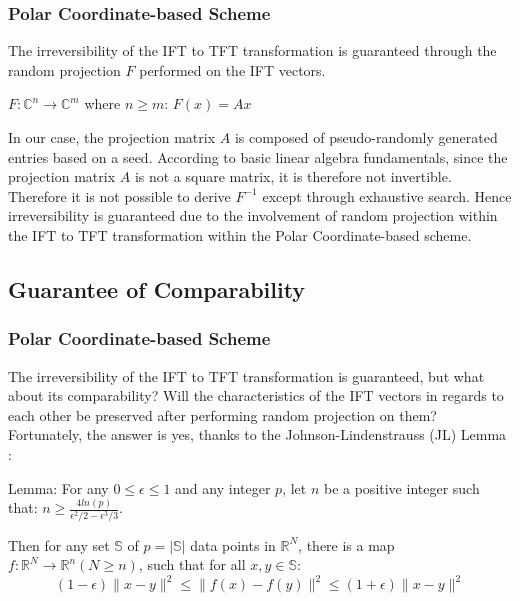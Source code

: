 \documentclass[fyp]{socreport}
\newcommand\norm[1]{\lVert#1\rVert}
\begin{document}
\subsubsection{Polar Coordinate-based Scheme}
The irreversibility of the IFT to TFT transformation is guaranteed through the random projection $F$ performed on the IFT vectors. 

\begin{center}
	$F: \mathbb{C}^{n} \to \mathbb{C}^m$ where $n \ge m$: $F(x) = Ax$
\end{center}

In our case, the projection matrix $A$ is composed of pseudo-randomly generated entries based on a seed. According to basic linear algebra fundamentals, since the projection matrix $A$ is not a square matrix, it is therefore not invertible. Therefore it is not possible to derive $F^{-1}$ except through exhaustive search. Hence irreversibility is guaranteed due to the involvement of random projection within the IFT to TFT transformation within the Polar Coordinate-based scheme.

\subsection{Guarantee of Comparability}
\subsubsection{Polar Coordinate-based Scheme}
The irreversibility of the IFT to TFT transformation is guaranteed, but what about its comparability? Will the characteristics of the IFT vectors in regards to each other be preserved after performing random projection on them? Fortunately, the answer is yes, thanks to the Johnson-Lindenstrauss (JL) Lemma \cite{lind84lem}:

\begin{center}
	Lemma: For any $0 \le \epsilon \leq 1$ and any integer $p$, let $n$ be a positive integer such that: $n \ge \frac{4 ln(p)}{\epsilon^2 / 2 - \epsilon^3 / 3}$.
	
	Then for any set $\mathbb{S}$ of $p = |\mathbb{S}|$ data points in $\mathbb{R}^N$, there is a map $f: \mathbb{R}^N \to \mathbb{R}^n (N \ge n)$, such that for all $x, y \in \mathbb{S}$:
\begin{equation}
	(1- \epsilon) \norm{x-y}^2 \leq \norm{f(x) - f(y)}^2 \leq (1+ \epsilon)\norm{x-y}^2
\end{equation}

\end{center}
\end{document}
